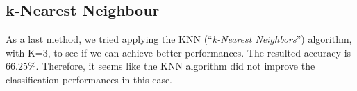 \subsection{k-Nearest Neighbour}

As a last method, we tried applying the KNN (``\textit{k-Nearest Neighbors}'') algorithm, with K=3, to see if we can achieve better performances. The resulted accuracy is $66.25\%$. Therefore, it seems like the KNN algorithm did not improve the classification performances in this case.